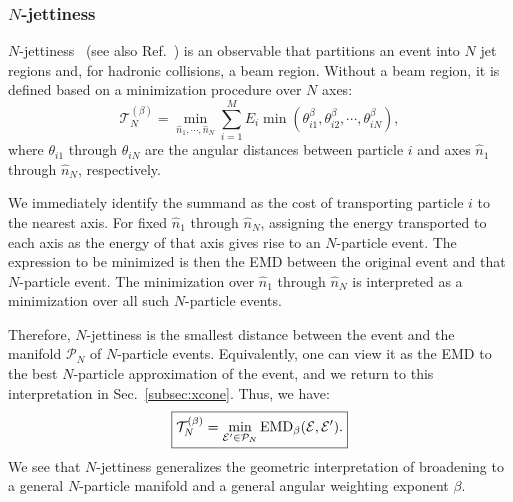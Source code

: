 \documentclass[letterpaper,11pt]{article}
\DeclareRobustCommand{\Sec}[1]{Sec.~\ref{#1}}
\DeclareRobustCommand{\Ref}[1]{Ref.~\cite{#1}}
\begin{document}
\subsubsection{$N$-jettiness}
\label{sec:njettiness}


$N$-jettiness~\cite{Stewart:2010tn} (see also \Ref{Brandt:1978zm}) is an observable that partitions an event into $N$ jet regions and, for hadronic collisions, a beam region.
%
Without a beam region, it is defined based on a minimization procedure over $N$ axes:
%
\begin{equation}\label{eq:Njettiness}
\mathcal T_N^{(\beta)} = \min_{\hat n_1,\cdots,\hat n_N} \sum_{i=1}^M E_i \min\left(\theta_{i1}^\beta, \theta_{i2}^\beta, \cdots, \theta_{iN}^\beta\right),
\end{equation}
%
where $\theta_{i1}$ through $\theta_{iN}$ are the angular distances between particle $i$ and axes $\hat n_1$ through $\hat n_N$, respectively.


We immediately identify the summand as the cost of transporting particle $i$ to the nearest axis.
%
For fixed $\hat n_1$ through $\hat n_N$, assigning the energy transported to each axis as the energy of that axis gives rise to an $N$-particle event.
%
The expression to be minimized is then the EMD between the original event and that $N$-particle event.
%
The minimization over $\hat n_1$ through $\hat n_N$ is interpreted as a minimization over all such $N$-particle events.


Therefore, $N$-jettiness is the smallest distance between the event and the manifold $\mathcal{P}_N$ of $N$-particle events.
%
Equivalently, one can view it as the EMD to the best $N$-particle approximation of the event, and we return to this interpretation in \Sec{subsec:xcone}.
%
Thus, we have:
\begin{equation}
\label{eq:Njettiness_asEMD}
\begin{boxed}{
\mathcal T_N^{(\beta)} = \min_{\mathcal E' \in \mathcal P_N} \text{EMD}_{\beta}(\mathcal E, \mathcal E').
}\end{boxed}
\end{equation}
%
We see that $N$-jettiness generalizes the geometric interpretation of broadening to a general $N$-particle manifold and a general angular weighting exponent $\beta$.
\end{document}
